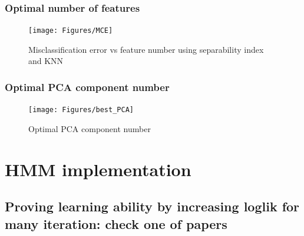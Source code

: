 \subsubsection{Optimal number of features}

\begin{figure}[ht!]
	\texttt{[image: Figures/MCE]}
	\caption{Misclassification error vs feature number using separability index and KNN}
	\label{fig:opt-dim}
\end{figure}

\subsubsection{Optimal PCA component number}
\begin{figure}[ht!]
	\texttt{[image: Figures/best\_PCA]}
	\caption{Optimal PCA component number}
	\label{fig:opt-pca}
\end{figure}

\section{HMM implementation}
\subsection{Proving learning ability by increasing loglik for many iteration: check one of papers}